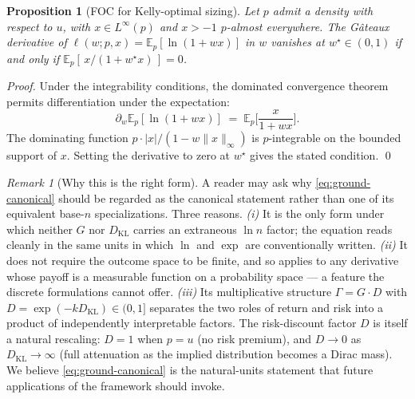 \documentclass[11pt]{article}
\newtheorem{proposition}[theorem]{Proposition}
\theoremstyle{definition}
\theoremstyle{remark}
\newtheorem{remark}[theorem]{Remark}
\newcommand{\E}{\mathbb{E}}
\newcommand{\KL}{D_{\mathrm{KL}}}
\begin{document}
\begin{proposition}[FOC for Kelly-optimal sizing]\label{prop:cts-foc}
Let $p$ admit a density with respect to $u$, with
$x \in L^\infty(p)$ and $x > -1$ $p$-almost everywhere. The Gâteaux
derivative of $\ell(w; p, x) = \E_p[\ln(1 + w x)]$ in $w$ vanishes at
$w^\star \in (0, 1)$ if and only if
$\E_p[\,x / (1 + w^\star x)\,] = 0$.
\end{proposition}

\begin{proof}
Under the integrability conditions, the dominated convergence
theorem permits differentiation under the expectation:
\begin{equation*}
\partial_w \E_p[\ln(1 + w x)]
   \;=\; \E_p\!\biggl[\frac{x}{1 + w x}\biggr].
\end{equation*}
The dominating function $p \cdot |x| / (1 - w \|x\|_\infty)$ is
$p$-integrable on the bounded support of $x$. Setting the derivative
to zero at $w^\star$ gives the stated condition.
\qed
\end{proof}

\begin{remark}[Why this is the right form]\label{rem:why-canonical}
A reader may ask why \eqref{eq:ground-canonical} should be regarded
as the canonical statement rather than one of its equivalent
base-$n$ specializations. Three reasons.
\emph{(i)} It is the only form under which neither $G$ nor $\KL$
carries an extraneous $\ln n$ factor; the equation reads cleanly in
the same units in which $\ln$ and $\exp$ are conventionally written.
\emph{(ii)} It does not require the outcome space to be finite, and
so applies to any derivative whose payoff is a measurable function on
a probability space --- a feature the discrete formulations cannot
offer.
\emph{(iii)} Its multiplicative structure $\Gamma = G \cdot D$ with
$D = \exp(-k \KL) \in (0, 1]$ separates the two roles of return and
risk into a product of independently interpretable factors. The
risk-discount factor $D$ is itself a natural rescaling: $D = 1$ when
$p = u$ (no risk premium), and $D \to 0$ as $\KL \to \infty$ (full
attenuation as the implied distribution becomes a Dirac mass). We
believe \eqref{eq:ground-canonical} is the natural-units statement
that future applications of the framework should invoke.
\end{remark}
\end{document}
